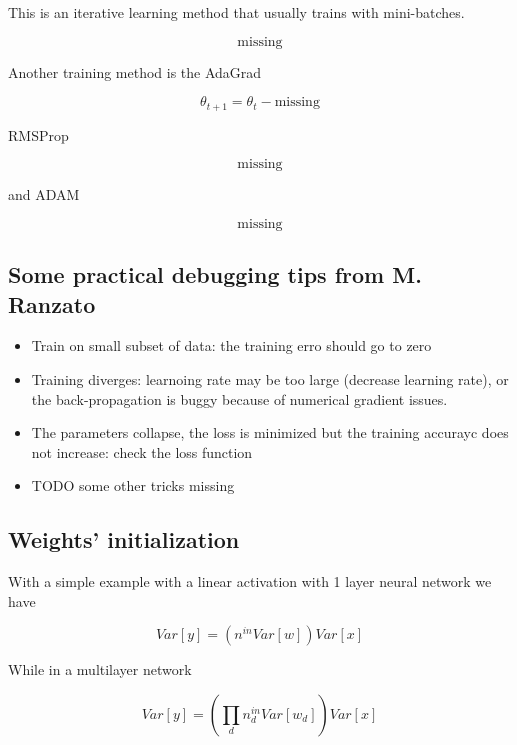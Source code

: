\documentclass[b5paper]{report}
\begin{document}
This is an iterative learning method that usually trains with mini-batches.

\begin{equation}
  \text{missing}
\end{equation}

Another training method is the AdaGrad

\begin{equation}
  \theta_{t+1} = \theta_t - \text{missing}
\end{equation}

RMSProp

\begin{equation}
  \text{missing}
\end{equation}

and ADAM

\begin{equation}
  \text{missing}
\end{equation}

\subsection{Some practical debugging tips from M. Ranzato}

\begin{itemize}
  \item Train on small subset of data: the training erro should go to zero
  \item Training diverges: learnoing rate may be too large (decrease learning
    rate), or the back-propagation is buggy because of numerical gradient
    issues.
  \item The parameters collapse, the loss is minimized but the training
    accurayc does not increase: check the loss function
  \item TODO some other tricks missing
\end{itemize}

\subsection{Weights' initialization}

With a simple example with a linear activation with 1 layer neural network we
have

\begin{equation}
  Var[y] = (n^{in}Var[w])Var[x]
\end{equation}

While in a multilayer network

\begin{equation}
  Var[y] = (\prod_d n_d^{in}Var[w_d])Var[x]
\end{equation}
\end{document}
